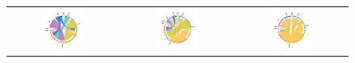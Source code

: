 \documentclass[a4paper]{article}
\begin{document}
\begin{figure}[h!]
{\begin{tabular}{ccc}
\includegraphics[width=0.4\textwidth, trim= {1.3cm 0.8cm 1.1cm 1cm}, clip]{"Figures/EORA_MIG_AGR_2010_19_ROW.pdf"} & \includegraphics[width=0.4\textwidth, trim= {1.3cm 0.8cm 1.1cm 1cm}, clip]{"Figures/EORA_MIG_FBE_2010_19_ROW.pdf"} &
\includegraphics[width=0.4\textwidth, trim= {1.3cm 0.8cm 1.1cm 1cm}, clip]{"Figures/EORA_MIG_MAN_2010_19_ROW.pdf"} \\
\end{tabular}
}
\end{figure}
\FloatBarrier
\end{document}

